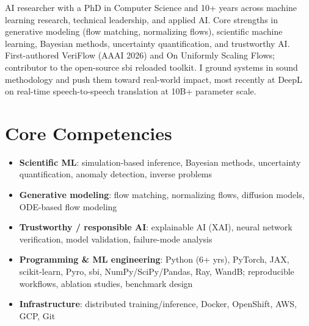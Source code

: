\documentclass[11pt,a4paper,sans]{moderncv}
\begin{document}
\makecvtitle


\vspace{6pt}
\small{AI researcher with a PhD in Computer Science and 10+ years across machine learning research, technical leadership, and applied AI. Core strengths in generative modeling (flow matching, normalizing flows), scientific machine learning, Bayesian methods, uncertainty quantification, and trustworthy AI. First-authored VeriFlow (AAAI 2026) and On Uniformly Scaling Flows; contributor to the open-source sbi reloaded toolkit. I ground systems in sound methodology and push them toward real-world impact, most recently at DeepL on real-time speech-to-speech translation at 10B+ parameter scale.}


\section{Core Competencies}
\vspace{1pt}
\begin{itemize}

\item \textbf{Scientific ML}: simulation-based inference, Bayesian methods, uncertainty quantification, anomaly detection, inverse problems

\item \textbf{Generative modeling}: flow matching, normalizing flows, diffusion models, ODE-based flow modeling

\item \textbf{Trustworthy / responsible AI}: explainable AI (XAI), neural network verification, model validation, failure-mode analysis

\item \textbf{Programming \& ML engineering}: Python (6+ yrs), PyTorch, JAX, scikit-learn, Pyro, sbi, NumPy/SciPy/Pandas, Ray, WandB; reproducible workflows, ablation studies, benchmark design

\item \textbf{Infrastructure}: distributed training/inference, Docker, OpenShift, AWS, GCP, Git

\end{itemize}
\end{document}
